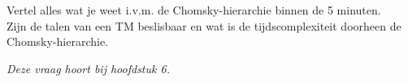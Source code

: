\begin{question}
Vertel alles wat je weet i.v.m. de Chomsky-hierarchie binnen de 5 minuten. \\
Zijn de talen van een TM beslisbaar en wat is de tijdscomplexiteit doorheen de Chomsky-hierarchie.
\end{question}

\textit{Deze vraag hoort bij hoofdstuk 6.}